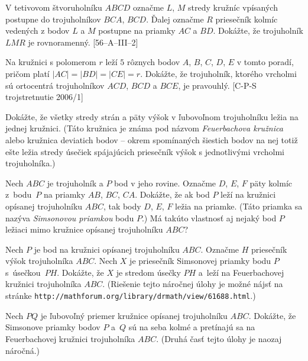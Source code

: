 {V tetivovom štvoruholníku $ABCD$ označme $L$, $M$ stredy kružníc vpísaných postupne do trojuholníkov $BCA$, $BCD$. Ďalej označme $R$ priesečník kolmíc vedených z bodov $L$ a $M$ postupne na priamky $AC$ a $BD$. Dokážte, že trojuholník $LMR$ je rovnoramenný.
[56--A--III--2]

Na kružnici s polomerom $r$ leží $5$ rôznych bodov $A$, $B$, $C$, $D$, $E$ v tomto poradí, pričom platí $|AC|=|BD|=|CE|=r$. Dokážte, že trojuholník, ktorého vrcholmi sú ortocentrá trojuholníkov $ACD$, $BCD$ a $BCE$, je pravouhlý.
[C-P-S trojstretnutie 2006/1]

Dokážte, že všetky stredy strán a päty výšok v ľubovoľnom trojuholníku ležia na jednej kružnici. (Táto kružnica je známa pod názvom {\it Feuerbachova kružnica} alebo kružnica deviatich bodov -- okrem spomínaných šiestich bodov na nej totiž ešte ležia stredy úsečiek spájajúcich priesečník výšok s jednotlivými vrcholmi trojuholníka.)

Nech $ABC$ je trojuholník a $P$ bod v jeho rovine. Označme $D$, $E$, $F$ päty kolmíc z~bodu~$P$ na priamky $AB$, $BC$, $CA$. Dokážte, že ak bod $P$ leží na kružnici opísanej trojuholníku $ABC$, tak body $D$, $E$, $F$ ležia na priamke. (Táto priamka sa nazýva {\it Simsonovou priamkou} bodu $P$.) Má takúto vlastnosť aj nejaký bod $P$ ležiaci mimo kružnice opísanej trojuholníku $ABC$?

Nech $P$ je bod na kružnici opísanej trojuholníku $ABC$. Označme $H$ priesečník výšok trojuholníka $ABC$. Nech $X$ je priesečník Simsonovej priamky bodu $P$ s~úsečkou~$PH$. Dokážte, že $X$ je stredom úsečky $PH$ a~leží na Feuerbachovej kružnici trojuholníka $ABC$. (Riešenie tejto náročnej úlohy je možné nájsť na stránke {\tt http://mathforum.org/library/drmath/view/61688.html}.)

Nech $PQ$ je ľubovoľný priemer kružnice opísanej trojuholníku $ABC$. Dokážte, že Simsonove priamky bodov $P$ a~$Q$ sú na seba kolmé a pretínajú sa na Feuerbachovej kružnici trojuholníka $ABC$. (Druhá časť tejto úlohy je naozaj náročná.)
}

